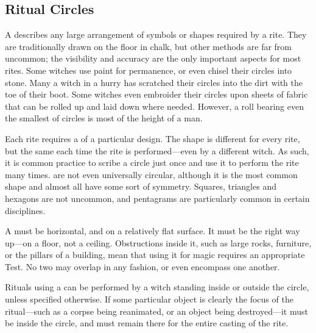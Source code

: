\subsection{Ritual Circles}

A  describes any large arrangement of symbols or shapes required by a rite.
They are traditionally drawn on the floor in chalk, but other methods are far from uncommon; the visibility and accuracy are the only important aspects for most rites.
Some witches use paint for permanence, or even chisel their circles into stone.
Many a witch in a hurry has scratched their circles into the dirt with the toe of their boot.
Some witches even embroider their circles upon sheets of fabric that can be rolled up and laid down where needed.
However, a roll bearing even the smallest of circles is most of the height of a man.

Each rite requires a  of a particular design.
The shape is different for every rite, but the same each time the rite is performed---even by a different witch.
As such, it is common practice to scribe a circle just once and use it to perform the rite many times.
 are not even universally circular, although it is the most common shape and almost all have some sort of symmetry.
Squares, triangles and hexagons are not uncommon, and pentagrams are particularly common in certain disciplines.

A  must be horizontal, and on a relatively flat surface.
It must be the right way up---on a floor, not a ceiling.
Obstructions inside it, such as large rocks, furniture, or the pillars of a building, mean that using it for magic requires an appropriate Test.
No two  may overlap in any fashion, or even encompass one another.

Rituals using a  can be performed by a witch standing inside or outside the circle, unless specified otherwise.
If some particular object is clearly the focus of the ritual---such as a corpse being reanimated, or an object being destroyed---it must be inside the circle, and must remain there for the entire casting of the rite.

